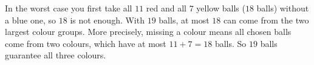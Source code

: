 In the worst case you first take all $11$ red and all $7$ yellow balls ($18$ balls) without a blue one, so $18$ is not enough. With $19$ balls, at most $18$ can come from the two largest colour groups. More precisely, missing a colour means all chosen balls come from two colours, which have at most $11+7=18$ balls. So $\boxed{19}$ balls guarantee all three colours.
